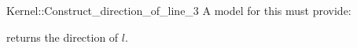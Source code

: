 \begin{ccRefFunctionObjectConcept}{Kernel::Construct_direction_of_line_3}
A model for this must provide:


       {returns the direction of $l$.}


\end{ccRefFunctionObjectConcept}
